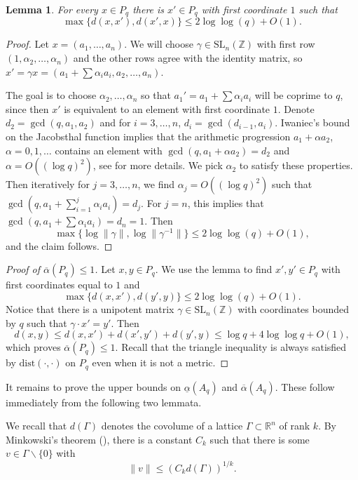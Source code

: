 \documentclass[12pt, a4paper]{amsart}
\numberwithin{equation}{section}
\newtheorem{lemma}[theorem]{Lemma}
\theoremstyle{definition}
\newcommand{\R}{\mathbb{R}}
\newcommand{\Z}{\mathbb{Z}}
\newcommand{\SL}{\mathrm{SL}}
\newcommand{\dist}{\mathrm{dist}}
\begin{document}
\begin{lemma}
    For every $x\in P_q$ there is $x'\in P_q$ with first coordinate $1$ such that 
    \[
    \max\{d(x,x'),d(x',x)\}\le 2 \log\log(q) +O(1). 
    \]
\end{lemma}
\begin{proof}
    Let $x= (a_1,\ldots,a_n)$. We will choose $\gamma \in \SL_n(\Z)$ with first row $(1,\alpha_2,\ldots,\alpha_n)$ and the other rows agree with the identity matrix, so $x' = \gamma x = (a_1+\sum \alpha_i a_i,a_2,\ldots,a_n)$.
    
    The goal is to choose $\alpha_2,\ldots,\alpha_n$ so that $a_1' = a_1+\sum \alpha_i a_i$ will be coprime to $q$, since then $x'$ is equivalent to an element with first coordinate $1$. Denote $d_2 = \gcd(q,a_1,a_2)$ and for $i=3,\ldots,n$, $d_i = \gcd(d_{i-1},a_i)$. Iwaniec's bound \cite{iwaniec1978} on the Jacobsthal function implies that the arithmetic progression $a_1+\alpha a_2$, $\alpha=0,1,\ldots$ contains an element with $\gcd(q,a_1+\alpha a_2)=d_2$ and $\alpha=O((\log q)^2)$, see \cite[Page 8]{sarnak2015lettermiller} for more details. We pick $\alpha_2$ to satisfy these properties. Then iteratively for $j=3,\ldots,n$, we find $\alpha_j = O((\log q)^2)$ such that $\gcd(q,a_1 +\sum_{i=1}^j \alpha_i a_i)=d_j$. For $j=n$, this implies that $\gcd(q,a_1+\sum \alpha_i a_i )=d_n=1$. Then
    \[
    \max\{\log \|\gamma\|, \log \|\gamma^{-1}\|\} \le 2 \log\log(q)+O(1),
    \]
    and the claim follows.
\end{proof}

\begin{proof}[Proof of $\overline{\alpha}(P_q)\le 1$]
Let $x,y\in P_q$.
We use the lemma to find $x',y'\in P_q$ with first coordinates equal to $1$ and
\[
\max\{d(x,x'),d(y',y)\}\le 2 \log\log(q) +O(1).
\]
Notice that there is a unipotent matrix $\gamma \in \SL_n(\Z)$ with coordinates bounded by $q$ such that $\gamma \cdot x'=y'$. Then 
\[
d(x,y) \le d(x,x')+d(x',y')+d(y',y) \le \log q + 4 \log \log q +O(1),
\]
which proves $\overline{\alpha}(P_q)\le 1$.
Recall that the triangle inequality is always satisfied by $\dist(\cdot,\cdot)$
on $P_q$ even when it is not a metric.
\end{proof}

It remains to prove the upper bounds on $\underline{\alpha}(A_q)$ and
$\overline{\alpha}(A_q)$.
These follow immediately from the following two lemmata.

We recall that $d(\Gamma)$ denotes the covolume of a lattice $\Gamma \subset \R^n$ of rank $k$. By Minkowski's theorem (\cite[Lecture II, \S 1]{siegel1989lectures}), there is a constant $C_k$ such that there is some $v\in\Gamma\backslash\{0\}$ with
\begin{equation}\label{eq:short element}
	\|v\|\le (C_k d(\Gamma))^{1/k}.
\end{equation}
\end{document}
